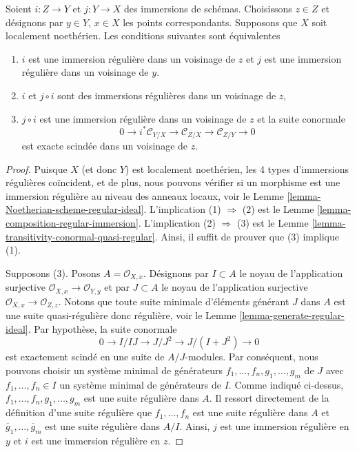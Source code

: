 \begin{lemma}
\label{lemma-extra-permanence-regular-immersion-noetherian}
Soient  $i : Z \to Y$  et  $j : Y \to X$  des immersions de schémas. Choisissons
 $z \in Z$  et désignons par  $y \in Y$,  $x \in X$  les points correspondants.
Supposons que  $X$  soit localement noethérien. Les conditions suivantes
sont équivalentes
\begin{enumerate}
\item $i$  est une immersion régulière dans un voisinage de  $z$  et
 $j$  est une immersion régulière dans un voisinage de  $y$.
\item $i$  et  $j \circ i$  sont des immersions régulières dans un voisinage de
 $z$,
\item $j \circ i$  est une immersion régulière dans un voisinage de  $z$  et la
suite conormale
$$
0 \to i^*\mathcal{C}_{Y/X} \to
\mathcal{C}_{Z/X} \to
\mathcal{C}_{Z/Y} \to 0
$$
est exacte scindée dans un voisinage de  $z$.
\end{enumerate}
\end{lemma}

\begin{proof}
Puisque  $X$  (et donc  $Y$) est localement noethérien, les 4
types d’immersions régulières coïncident, et de plus, nous pouvons vérifier si un
morphisme est une immersion régulière au niveau des anneaux locaux, voir le Lemme
 \ref{lemma-Noetherian-scheme-regular-ideal}. L’implication (1)  $\Rightarrow$  (2) est le Lemme  \ref{lemma-composition-regular-immersion}.
L’implication (2)  $\Rightarrow$  (3) est le Lemme  \ref{lemma-transitivity-conormal-quasi-regular}. Ainsi, il suffit de
prouver que (3) implique (1).

\medskip\noindent
Supposons (3). Posons  $A = \mathcal{O}_{X, x}$. Désignons par  $I \subset A$  le noyau de
l'application surjective  $\mathcal{O}_{X, x} \to \mathcal{O}_{Y, y}$  et par  $J \subset A$  le noyau de
l'application surjective  $\mathcal{O}_{X, x} \to \mathcal{O}_{Z, z}$. Notons que toute suite minimale d'éléments
générant  $J$  dans  $A$  est une suite quasi-régulière donc
régulière, voir le Lemme  \ref{lemma-generate-regular-ideal}. Par hypothèse, la suite conormale
$$
0 \to I/IJ \to J/J^2 \to J/(I + J^2) \to 0
$$
est exactement scindé en une suite de  $A/J$-modules. Par conséquent, nous
pouvons choisir un système minimal de générateurs  $f_1, \ldots, f_n, g_1, \ldots, g_m$  de  $J$ 
avec  $f_1, \ldots, f_n \in I$  un système minimal de générateurs de  $I$. Comme indiqué
ci-dessus,  $f_1, \ldots, f_n, g_1, \ldots, g_m$  est une suite régulière dans  $A$. Il ressort
directement de la définition d'une suite régulière que  $f_1, \ldots, f_n$  est une suite
régulière dans  $A$  et  $\overline{g}_1, \ldots, \overline{g}_m$  est une suite régulière dans
 $A/I$. Ainsi,  $j$  est une immersion régulière en  $y$  et
 $i$  est une immersion régulière en  $z$.
\end{proof}

